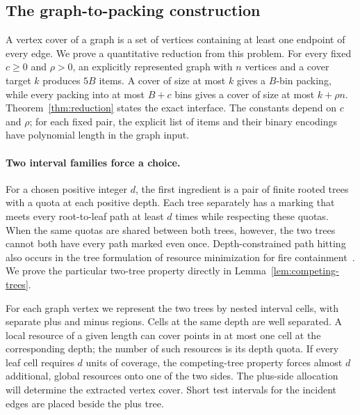 \subsection{The graph-to-packing construction}

A vertex cover of a graph is a set of vertices containing at least one
endpoint of every edge. We prove a quantitative reduction from this
problem. For every fixed $c\ge0$ and $\rho>0$, an explicitly represented
graph with $n$ vertices and a cover target $k$ produces $5B$ items.
A cover of size at most $k$ gives a $B$-bin packing, while every packing
into at most $B+c$ bins gives a cover of size at most $k+\rho n$.
Theorem~\ref{thm:reduction} states the exact interface. The constants
depend on $c$ and $\rho$; for each fixed pair, the explicit list of items
and their binary encodings have polynomial length in the graph input.

\paragraph{Two interval families force a choice.}
For a chosen positive integer $d$, the first ingredient is a pair of
finite rooted trees with a quota at each positive depth.
Each tree separately has a marking that meets every
root-to-leaf path at least $d$ times while respecting these quotas.
When the same quotas are shared between both trees, however, the two
trees cannot both have every path marked even once.
Depth-constrained path hitting also occurs in the tree formulation of
resource minimization for fire containment~\cite{ChalermsookChuzhoy2010}.
We prove the particular two-tree property directly in
Lemma~\ref{lem:competing-trees}.

For each graph vertex we represent the two trees by nested interval
cells, with separate plus and minus regions. Cells at the same depth are
well separated. A local resource of a given length can cover points in
at most one cell at the corresponding depth; the number of such resources
is its depth quota. If every leaf cell requires $d$ units of coverage,
the competing-tree property forces almost $d$ additional, global resources
onto one of the two sides. The plus-side allocation will determine the
extracted vertex cover. Short test intervals for the incident edges are
placed beside the plus tree.

